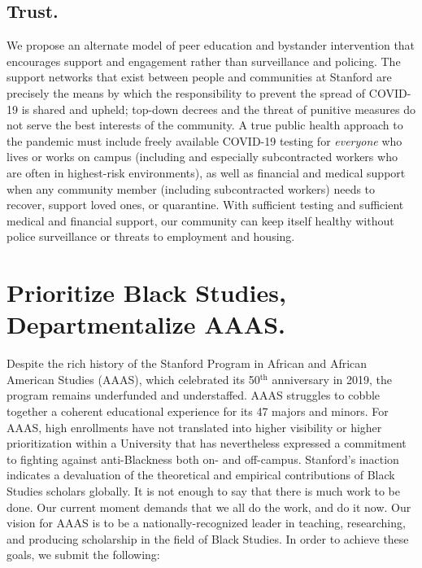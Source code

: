 \documentclass[12pt, titlepage, letterpaper]{article}
\begin{document}
\subsection*{Trust.}
%
We propose an alternate model of peer education and bystander intervention that encourages support and engagement rather than surveillance and policing. The support networks that exist between people and communities at Stanford are precisely the means by which the responsibility to prevent the spread of COVID-19 is shared and upheld; top-down decrees and the threat of punitive measures do not serve the best interests of the community. A true public health approach to the pandemic must include freely available COVID-19 testing for \textit{everyone} who lives or works on campus (including and especially subcontracted workers who are often in highest-risk environments), as well as financial and medical support when any community member (including subcontracted workers) needs to recover, support loved ones, or quarantine. With sufficient testing and sufficient medical and financial support, our community can keep itself healthy without police surveillance or threats to employment and housing.

\newpage
\section*{Prioritize Black Studies, Departmentalize AAAS.}
%
\vspace{0.3em}\hline\hline

Despite the rich history of the Stanford Program in African and African American Studies (AAAS), which celebrated its 50$^\mathrm{th}$ anniversary in 2019, the program remains underfunded and understaffed. AAAS struggles to cobble together a coherent educational experience for its 47 majors and minors. For AAAS, high enrollments have not translated into higher visibility or higher prioritization within a University that has nevertheless expressed a commitment to fighting against anti-Blackness both on- and off-campus. Stanford’s inaction indicates a devaluation of the theoretical and empirical contributions of Black Studies scholars globally. It is not enough to say that there is much work to be done. Our current moment demands that we all do the work, and do it now. Our vision for AAAS is to be a nationally-recognized leader in teaching, researching, and producing scholarship in the field of Black Studies. In order to achieve these goals, we submit the following:
\end{document}
